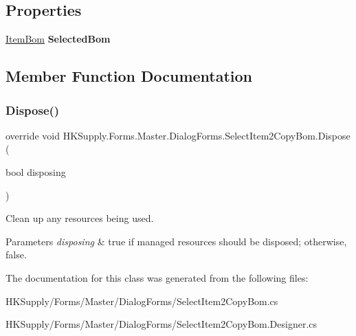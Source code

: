 \subsection*{Properties}
\begin{DoxyCompactItemize}
\item 
\mbox{\label{class_h_k_supply_1_1_forms_1_1_master_1_1_dialog_forms_1_1_select_item2_copy_bom_a323acfa4c23e8d31b3d67cb93d4f5461}} 
\mbox{\hyperlink{class_h_k_supply_1_1_models_1_1_item_bom}{Item\+Bom}} {\bfseries Selected\+Bom}
\end{DoxyCompactItemize}


\subsection{Member Function Documentation}
\mbox{\label{class_h_k_supply_1_1_forms_1_1_master_1_1_dialog_forms_1_1_select_item2_copy_bom_a2f3441993b283eb01930010719c378a8}} 
\subsubsection{\texorpdfstring{Dispose()}{Dispose()}}
{\footnotesize\ttfamily override void H\+K\+Supply.\+Forms.\+Master.\+Dialog\+Forms.\+Select\+Item2\+Copy\+Bom.\+Dispose (\begin{DoxyParamCaption}\item[{bool}]{disposing }\end{DoxyParamCaption})\hspace{0.3cm}{\ttfamily [protected]}}



Clean up any resources being used. 


\begin{DoxyParams}{Parameters}
{\em disposing} & true if managed resources should be disposed; otherwise, false.\\
\hline
\end{DoxyParams}


The documentation for this class was generated from the following files\+:\begin{DoxyCompactItemize}
\item 
H\+K\+Supply/\+Forms/\+Master/\+Dialog\+Forms/Select\+Item2\+Copy\+Bom.\+cs\item 
H\+K\+Supply/\+Forms/\+Master/\+Dialog\+Forms/Select\+Item2\+Copy\+Bom.\+Designer.\+cs\end{DoxyCompactItemize}
